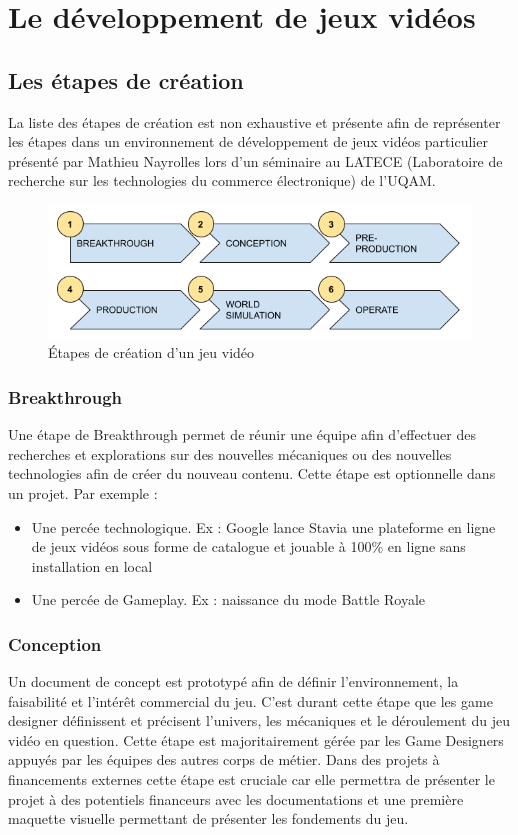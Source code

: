 \chapter{Le développement de jeux vidéos}
 
 
\section{Les étapes de création}
La liste des étapes de création est non exhaustive et présente afin de représenter les étapes dans un environnement de développement de jeux vidéos particulier présenté par Mathieu Nayrolles lors d'un séminaire au LATECE (Laboratoire de recherche sur les technologies du commerce électronique) de l'UQAM.
\begin{figure}[H]
    \centering
    \includegraphics[width=14cm]{10_img/production_stages.png} 
    \caption{Étapes de création d'un jeu vidéo}
\end{figure}
\subsection{Breakthrough}
Une étape de Breakthrough permet de réunir une équipe afin d'effectuer des recherches et explorations sur des nouvelles mécaniques ou des nouvelles technologies afin de créer du nouveau contenu. Cette étape est optionnelle dans un projet.
Par exemple :
\begin{itemize}
    \item Une percée technologique. Ex : Google lance Stavia une plateforme en ligne de jeux vidéos sous forme de catalogue et jouable à 100\% en ligne sans installation en local
    \item Une percée de Gameplay. Ex : naissance du mode Battle Royale
\end{itemize}

\subsection{Conception}
Un document de concept est prototypé afin de définir l'environnement, la faisabilité et l'intérêt commercial du jeu. C'est durant cette étape que les game designer définissent et précisent l'univers, les mécaniques et le déroulement du jeu vidéo en question. Cette étape est majoritairement gérée par les Game Designers appuyés par les équipes des autres corps de métier. Dans des projets à financements externes cette étape est cruciale car elle permettra de présenter le projet à des potentiels financeurs avec les documentations et une première maquette visuelle permettant de présenter les fondements du jeu.

